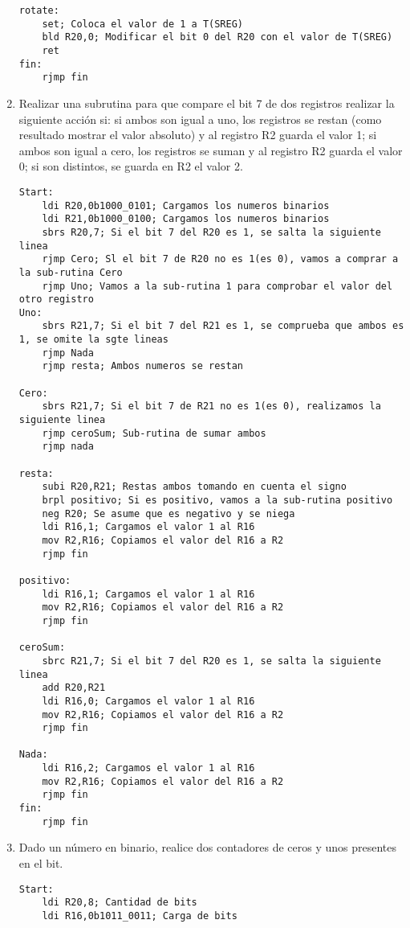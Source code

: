 \documentclass[
	12pt, %
	fleqn, %
	a4paper, %
]{LegrandOrangeBook}
\begin{document}
\begin{enumerate}
\begin{lstlisting}[language={[x86masm]Assembler},frame=single,caption={Uso del SET para modificar T(SREG)},captionpos=b,numbers=none]
rotate:
	set; Coloca el valor de 1 a T(SREG)
	bld R20,0; Modificar el bit 0 del R20 con el valor de T(SREG)
	ret
fin:
	rjmp fin
\end{lstlisting}
\item Realizar una subrutina para que compare el bit 7 de dos registros realizar la siguiente acción si: si ambos son igual a uno, los registros se restan (como resultado mostrar el valor absoluto) y al registro R2 guarda el valor 1; si ambos son igual a cero, los registros se suman y al registro R2 guarda el valor 0; si son distintos, se guarda en R2 el valor 2.
\begin{lstlisting}[language={[x86masm]Assembler},frame=single,caption={Sub-rutinas con comparación de bits},captionpos=b,numbers=none]
Start:
	ldi R20,0b1000_0101; Cargamos los numeros binarios 
	ldi R21,0b1000_0100; Cargamos los numeros binarios
	sbrs R20,7; Si el bit 7 del R20 es 1, se salta la siguiente linea
	rjmp Cero; Sl el bit 7 de R20 no es 1(es 0), vamos a comprar a la sub-rutina Cero
	rjmp Uno; Vamos a la sub-rutina 1 para comprobar el valor del otro registro
Uno:
	sbrs R21,7; Si el bit 7 del R21 es 1, se comprueba que ambos es 1, se omite la sgte lineas
	rjmp Nada
	rjmp resta; Ambos numeros se restan

Cero:
	sbrs R21,7; Si el bit 7 de R21 no es 1(es 0), realizamos la siguiente linea
	rjmp ceroSum; Sub-rutina de sumar ambos
	rjmp nada

resta:
	subi R20,R21; Restas ambos tomando en cuenta el signo
	brpl positivo; Si es positivo, vamos a la sub-rutina positivo
	neg R20; Se asume que es negativo y se niega
	ldi R16,1; Cargamos el valor 1 al R16
	mov R2,R16; Copiamos el valor del R16 a R2
	rjmp fin

positivo:
	ldi R16,1; Cargamos el valor 1 al R16
	mov R2,R16; Copiamos el valor del R16 a R2
	rjmp fin

ceroSum:
	sbrc R21,7; Si el bit 7 del R20 es 1, se salta la siguiente linea
	add R20,R21
	ldi R16,0; Cargamos el valor 1 al R16
	mov R2,R16; Copiamos el valor del R16 a R2
	rjmp fin

Nada: 
	ldi R16,2; Cargamos el valor 1 al R16
	mov R2,R16; Copiamos el valor del R16 a R2
	rjmp fin
fin:
	rjmp fin
\end{lstlisting}
\item Dado un número en binario, realice dos contadores de ceros y unos presentes en el bit.
\begin{lstlisting}[language={[x86masm]Assembler},frame=single,caption={Contador de ceros},captionpos=b,numbers=none]
Start:
	ldi R20,8; Cantidad de bits
	ldi R16,0b1011_0011; Carga de bits


\end{lstlisting}
\end{enumerate}
\end{document}
